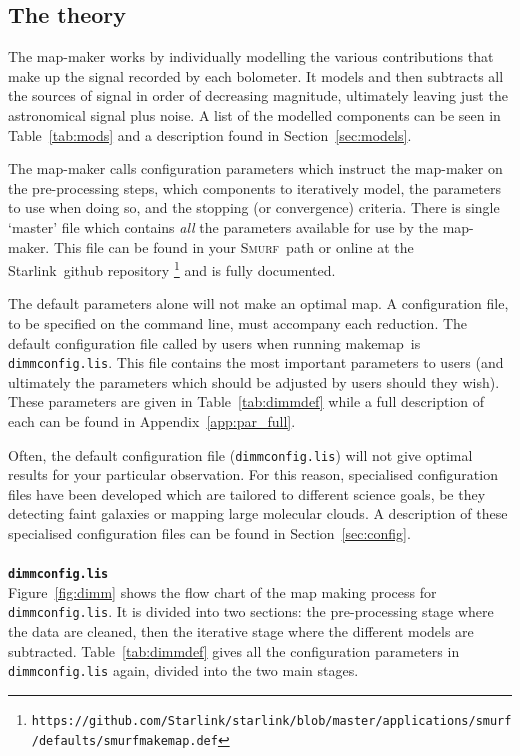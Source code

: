 \documentclass[twoside,11pt]{article}
\newcommand{\htmladdnormallink}[2]{#1}
\newcommand{\htmlref}[2]{#1}
\newcommand{\latex}[1]{#1}
\newcommand{\latexhtml}[2]{#1}
\newcommand{\xref}[3]{#1}
\newcommand{\xlabel}[1]{}
\renewcommand{\_}{\texttt{\symbol{95}}}
\newcommand{\starlink}{\htmladdnormallink{Starlink}{http://starlink.jach.hawaii.edu}}
\newcommand{\smurf}{\xref{\textsc{Smurf}}{sun258}{}}
\newcommand{\task}[1]{\textsf{#1}}
\newcommand{\makemap}{\xref{\task{makemap}}{sun258}{MAKEMAP}}
\newcommand{\cref}[3]{\latexhtml{#1~\ref{#2}}{\htmlref{#3}{#2}}}
\begin{document}
\subsection{\xlabel{dimm_theory}The theory}
\label{sec:dimm_theory}

The map-maker works by individually modelling the various
contributions that make up the signal recorded by each bolometer. It
models and then subtracts all the sources of signal in order of
decreasing magnitude, ultimately leaving just the astronomical signal
plus noise. A list of the modelled components can be seen in
\cref{Table}{tab:mods}{tabulated} and a description found in
\cref{Section}{sec:models}{The Individual Models}.

The map-maker calls configuration parameters which instruct the
map-maker on the pre-processing steps, which components to iteratively
model, the parameters to use when doing so, and the stopping (or
convergence) criteria. There is single `master' file which contains
\emph{all} the parameters available for use by the map-maker. This
file can be found in your \smurf\ path or online at the \starlink\
\htmladdnormallink{github repository}{https://github.com/Starlink/starlink/blob/master/applications/smurf/defaults/smurf\_makemap.def}
\latex{\footnote{\texttt{https://github.com/Starlink/starlink/blob/master/applications/smurf/defaults/smurf\_makemap.def}}}
 and is fully documented.

The default parameters alone will not make an optimal map. A
configuration file, to be specified on the command line, must
accompany each reduction. The default configuration file called by
users when running \makemap\ is \texttt{dimmconfig.lis}. This file
contains the most important parameters to users (and ultimately the
parameters which should be adjusted by users should they wish). These
parameters are given in \cref{Table}{tab:dimmdef}{a following table}
while a full description of each can be found in
\cref{Appendix}{app:par_full}{an appendix}.

Often, the default configuration file (\texttt{dimmconfig.lis}) will
not give optimal results for your particular observation. For this
reason, specialised configuration files have been developed which are
tailored to different science goals, be they detecting faint galaxies
or mapping large molecular clouds. A description of these specialised
configuration files can be found \cref{in Section}{sec:config}{here}.
\\ \\
{\large{\texttt{\bf dimmconfig.lis}}}\\
\cref{Figure}{fig:dimm}{The graphic below} shows the flow chart
of the map making process
for \texttt{dimmconfig.lis}. It is divided into two sections: the
pre-processing stage where the data are cleaned, then the iterative
stage where the different models are subtracted.
\cref{Table}{tab:dimmdef}{A table of active variables} gives all the
configuration parameters in \texttt{dimmconfig.lis} again, divided
into the two main stages.
\end{document}
